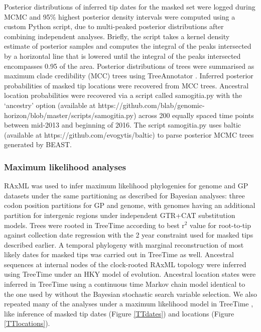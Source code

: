 \documentclass{bmcart}
\begin{document}
Posterior distributions of inferred tip dates for the masked set were logged during MCMC and 95\% highest posterior density intervals were computed using a custom Python script, due to multi-peaked posterior distributions after combining independent analyses.
Briefly, the script takes a kernel density estimate of posterior samples and computes the integral of the peaks intersected by a horizontal line that is lowered until the integral of the peaks intersected encompasses 0.95 of the area.
Posterior distributions of trees were summarised as maximum clade credibility (MCC) trees using TreeAnnotator \cite{suchard_bayesian_2018}.
Inferred posterior probabilities of masked tip locations were recovered from MCC trees.
Ancestral location probabilities were recovered via a script called samogitia.py with the `ancestry' option (available at https://github.com/blab/genomic-horizon/blob/master/scripts/samogitia.py) across 200 equally spaced time points between mid-2013 and beginning of 2016.
The script samogitia.py uses baltic (available at https://github.com/evogytis/baltic) to parse posterior MCMC trees generated by BEAST.

\subsubsection*{Maximum likelihood analyses}
RAxML \cite{stamatakis_raxml_2014} was used to infer maximum likelihood phylogenies for genome and GP datasets under the same partitioning as described for Bayesian analyses: three codon position partitions for GP and genome, with genomes having an additional partition for intergenic regions under independent GTR+CAT substitution models.
Trees were rooted in TreeTime according to best r$^{2}$ value for root-to-tip against collection date regression with the 2 year constraint used for masked tips described earlier.
A temporal phylogeny with marginal reconstruction of most likely dates for masked tips was carried out in TreeTime \cite{sagulenko_treetime:_2018} as well.
Ancestral sequences at internal nodes of the clock-rooted RAxML topology were inferred using TreeTime under an HKY model \cite{hky_1985} of evolution.
Ancestral location states were inferred in TreeTime using a continuous time Markov chain model identical to the one used by \cite{lemey_bayesian_2009} without the Bayesian stochastic search variable selection.
We also repeated many of the analyses under a maximum likelihood model in TreeTime \cite{sagulenko_treetime:_2018}, like inference of masked tip dates (Figure \ref{TTdates}) and locations (Figure \ref{TTlocations}).
\end{document}
